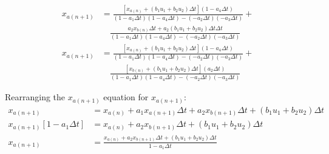 \documentclass[11pt]{article}
\begin{document}
\begin{subequations}
\begin{align}
    x_{a(n+1)} &= \frac{[x_{a(n)} + (b_1 u_1 + b_2 u_2)\Delta t](1 - a_4\Delta t)}{(1 - a_1\Delta t)(1 - a_4\Delta t) - (- a_2\Delta t)(- a_3\Delta t)} + \\ \nonumber
    &\quad \frac{a_2 x_{b(n)} \Delta t + a_2(b_1 u_1 + b_2 u_2)\Delta t\Delta t}{(1 - a_1\Delta t)(1 - a_4\Delta t) - (- a_2\Delta t)(- a_3\Delta t)} \\
    x_{a(n+1)} &= \frac{[x_{a(n)} + (b_1 u_1 + b_2 u_2)\Delta t](1 - a_4\Delta t)}{(1 - a_1\Delta t)(1 - a_4\Delta t) - (- a_2\Delta t)(- a_3\Delta t)} + \\ \nonumber
    &\quad \frac{[x_{b(n)} + (b_1 u_1 + b_2 u_2)\Delta t](a_2\Delta t)}{(1 - a_1\Delta t)(1 - a_4\Delta t) - (- a_2\Delta t)(- a_3\Delta t)}
  \end{align}
\end{subequations}

Rearranging the $x_{a(n+1)}$ equation for $x_{a(n+1)}$:
\begin{subequations}
  \begin{align}
    x_{a(n+1)} &= x_{a(n)} +  a_1 x_{a(n+1)}\Delta t + a_2 x_{b(n+1)}\Delta t + (b_1 u_1 + b_2 u_2)\Delta t \\
    x_{a(n+1)}\left[1 - a_1\Delta t\right] &= x_{a(n)} + a_2 x_{b(n+1)}\Delta t + (b_1 u_1 + b_2 u_2)\Delta t \\
    x_{a(n+1)} &= \frac{x_{a(n)} + a_2 x_{b(n+1)}\Delta t + (b_1 u_1 + b_2 u_2)\Delta t}{1 - a_1\Delta t}
  \end{align}
\end{subequations}
\end{document}
